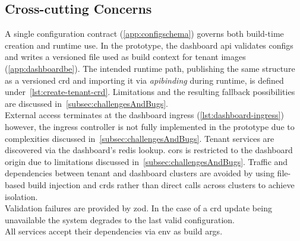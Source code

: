 \documentclass[11pt, a4paper, oneside, listof=totoc]{scrartcl}
\begin{document}
        \subsection{Cross-cutting Concerns}\label{subsec:crossCuttingConcerns}
            A single configuration contract (\autoref{app:configschema}) governs both build-time
            creation and runtime use.
            In the prototype, the dashboard \gls{api} validates configs and writes a versioned file
            used as build context for tenant images (\autoref{app:dashboardbe}).
            The intended runtime path, publishing the same structure as a versioned \gls{crd} and
            importing it via \emph{\gls{apibinding}} during runtime, is defined
            under~\autoref{lst:create-tenant-crd}.
            Limitations and the resulting fallback possibilities are discussed
            in~\autoref{subsec:challengesAndBugs}.\\
            External access terminates at the dashboard \gls{ingress} (\autoref{lst:dashboard-ingress})
            however, the \gls{ingress} controller is not fully implemented in the prototype due to
            complexities discussed in~\autoref{subsec:challengesAndBugs}.
            Tenant services are discovered via the dashboard's \gls{redis} lookup.
            \gls{cors} is restricted to the dashboard origin due to limitations discussed
            in~\autoref{subsec:challengesAndBugs}.
            Traffic and dependencies between tenant and dashboard clusters are avoided by using
            file-based build injection and \glspl{crd} rather than direct calls across clusters
            to achieve isolation.\\
            Validation failures are provided by zod.
            In the case of a \gls{crd} update being unavailable the system degrades to the last
            valid configuration.\\
            All services accept their dependencies via env as build args.
\end{document}
